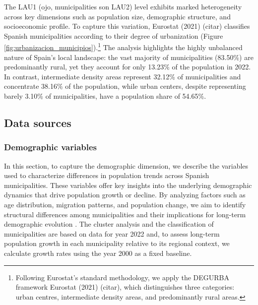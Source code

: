 \documentclass[a4paper,11pt,oneside]{article}
\begin{document}
The {\color{red}LAU1 (ojo, municipalities son LAU2)} level exhibits marked heterogeneity across key dimensions such as population size, demographic structure, and socioeconomic profile. To capture this variation, {\color{red}Eurostat (2021) (citar)} classifies Spanish municipalities according to their degree of urbanization (Figure \ref{fig:urbanizacion_municipios}).\footnote{Following Eurostat’s standard methodology, we apply the DEGURBA framework {\color{red}Eurostat (2021) (citar)}, which distinguishes three categories: urban centres, intermediate density areas, and predominantly rural areas.} The analysis highlights the highly unbalanced nature of Spain's local landscape: the vast majority of municipalities (83.50\%) are predominantly rural, yet they account for only 13.23\% of the population in 2022. In contrast, intermediate density areas represent 32.12\% of municipalities and concentrate 38.16\% of the population, while urban centers, despite representing barely 3.10\% of municipalities, have a population share of 54.65\%.





\subsection{Data sources}
\label{sec:data}


\subsubsection{Demographic variables}
\label{sec:demographic_variables}


In this section, to capture the demographic dimension, we describe the variables used to characterize differences in population trends across Spanish municipalities. These variables offer key insights into the underlying demographic dynamics that drive population growth or decline. By analyzing factors such as age distribution, migration patterns, and population change, we aim to identify structural differences among municipalities and their implications for long-term demographic evolution \citep{jessen2024role}. The cluster analysis and the classification of municipalities are based on data for year 2022 and, to assess long-term population growth in each municipality relative to its regional context, we calculate growth rates using the year 2000 as a fixed baseline.
\end{document}
